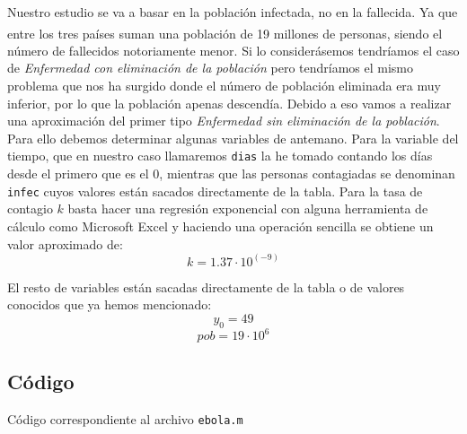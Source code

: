 \documentclass[a4paper,11pt]{article}
\numberwithin{equation}{section}
\begin{document}
\indent Nuestro estudio se va a basar en la población infectada, no en la fallecida. Ya que entre los tres países suman una población de 19 millones de personas{\tiny \bf \textsuperscript{\cite{guinea}}}{\tiny \bf \textsuperscript{\cite{sierraleona}}}{\tiny \bf \textsuperscript{\cite{liberia}}}, siendo el número de fallecidos notoriamente menor. Si lo considerásemos tendríamos el caso de \textit{Enfermedad con eliminación de la población} pero tendríamos el mismo problema que nos ha surgido donde el número de población eliminada era muy inferior, por lo que la población apenas descendía. Debido a eso vamos a realizar una aproximación del primer tipo \textit{Enfermedad sin eliminación de la población}.\\

\indent Para ello debemos determinar algunas variables de antemano. Para la variable del tiempo, que en nuestro caso llamaremos \texttt{dias} la he tomado contando los días desde el primero que es el 0, mientras que las personas contagiadas se denominan \texttt{infec} cuyos valores están sacados directamente de la tabla. Para la tasa de contagio $ k $ basta hacer una regresión exponencial con alguna herramienta de cálculo como Microsoft Excel y haciendo una operación sencilla se obtiene un valor aproximado de:
\begin{equation}
k=1.37\cdot 10^(-9)
\end{equation}

\indent El resto de variables están sacadas directamente de la tabla o de valores conocidos que ya hemos mencionado: 
\begin{equation}
y_0=49
\end{equation}
\begin{equation}
pob=19\cdot 10^{6}
\end{equation}

\subsection{Código}
\indent Código correspondiente al archivo \texttt{ebola.m}

\end{document}
